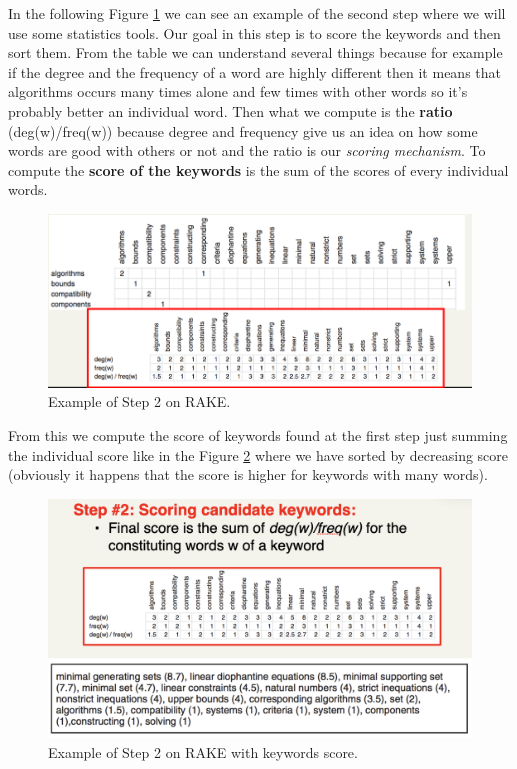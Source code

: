 In the following Figure \ref{fig:rakestep2} we can see an example of the second step where we will use some statistics tools. Our goal in this step is to score the keywords and then sort them. From the table we can understand several things because for example if the degree and the frequency of a word are highly different then it means that algorithms occurs many times alone and few times with other words so it's probably better an individual word. Then what we compute is the \textbf{ratio} (deg(w)/freq(w)) because degree and frequency give us an idea on how some words are good with others or not and the ratio is our \textit{scoring mechanism}. To compute the \textbf{score of the keywords} is the sum of the scores of every individual words.\newline
\begin{figure}
    \centering
    \includegraphics[width=\linewidth]{images/examplestep2.png}
    \caption{Example of Step 2 on RAKE.}
    \label{fig:rakestep2}
\end{figure}
From this we compute the score of keywords found at the first step just summing the individual score like in the Figure \ref{fig:step2scoring} where we have sorted by decreasing score (obviously it happens that the score is higher for keywords with many words).\newline
\begin{figure}
    \centering
    \includegraphics[width=\linewidth]{images/step2scoring.png}
    \caption{Example of Step 2 on RAKE with keywords score.}
    \label{fig:step2scoring}
\end{figure}
